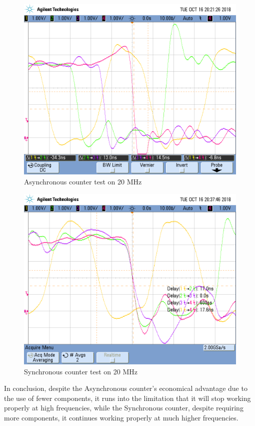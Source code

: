 \documentclass[paper=a4]{article}
\begin{document}
    \begin{figure}[ht]
        \begin{center}
            \includegraphics[width=\linewidth]{images/e3_e7_async20mhz.png}
            \caption{Asynchronous counter test on 20 MHz}
            \label{fig:e7asynctest3}
        \end{center}
    \end{figure}

    \begin{figure}[ht]
        \begin{center}
            \includegraphics[width=\linewidth]{images/e3_e7_sync_20mhz.png}
            \caption{Synchronous counter test on 20 MHz}
            \label{fig:e7synctest3}
        \end{center}
    \end{figure}

    In conclusion, despite the Asynchronous counter's economical advantage due to the use of fewer components, it
    runs into the limitation that it will stop working properly at high frequencies, while the Synchronous counter,
    despite requiring more components, it continues working properly at much higher frequencies.
\end{document}
